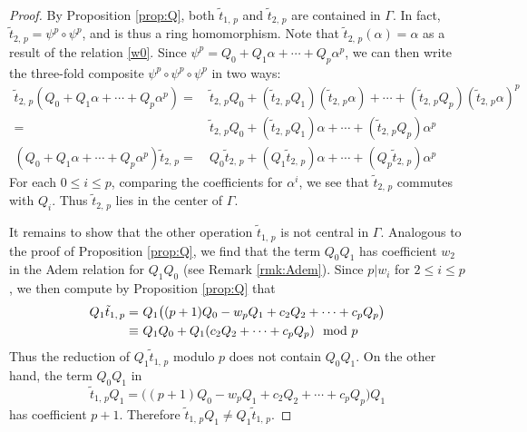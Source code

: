 \documentclass{gtpart}
\theoremstyle{definition}
\theoremstyle{remark}
\newcommand{\md}{~~{\rm mod}~}
\newcommand{\A}{\alpha}
\newcommand{\G}{\Gamma}
\renewcommand{\=}{\approx}
\renewcommand{\-}{\sim}
\numberwithin{equation}{section}
\numberwithin{thm}{section}
\begin{document}
\begin{proof}
 By Proposition \ref{prop:Q}, both $\tilde{t}_{1,\,p}$ and $\tilde{t}_{2,\,p}$ 
 are contained in $\G$.  In fact, $\tilde{t}_{2,\,p} = \psi^p \circ \psi^p$, and 
 is thus a ring homomorphism.  Note that $\tilde{t}_{2,\,p}(\A) = \A$ as a 
 result of the relation \eqref{w0}.  Since 
 $\psi^p = Q_0 + Q_1 \A + \cdots + Q_p \A^p$, we can then write the three-fold 
 composite $\psi^p \circ \psi^p \circ \psi^p$ in two ways: 
 \begin{equation*}
  \begin{split}
   \tilde{t}_{2,\,p} (Q_0 + Q_1 \A + \cdots + Q_p \A^p) = 
    & ~ \tilde{t}_{2,\,p} Q_0 + (\tilde{t}_{2,\,p} Q_1) (\tilde{t}_{2,\,p} \A) 
      + \cdots + (\tilde{t}_{2,\,p} Q_p) (\tilde{t}_{2,\,p} \A)^p \\
                                                        = 
    & ~ \tilde{t}_{2,\,p} Q_0 + (\tilde{t}_{2,\,p} Q_1) \A + \cdots 
      + (\tilde{t}_{2,\,p} Q_p) \A^p \\
   (Q_0 + Q_1 \A + \cdots + Q_p \A^p) \tilde{t}_{2,\,p} = 
    & ~ Q_0 \tilde{t}_{2,\,p} + (Q_1 \tilde{t}_{2,\,p}) \A + \cdots 
      + (Q_p \tilde{t}_{2,\,p}) \A^p 
  \end{split}
 \end{equation*}
 For each $0 \leq i \leq p$, comparing the coefficients for $\A^i$, we see that 
 $\tilde{t}_{2,\,p}$ commutes with $Q_i$.  Thus $\tilde{t}_{2,\,p}$ lies in the 
 center of $\G$.  

 It remains to show that the other operation $\tilde{t}_{1,\,p}$ is not central 
 in $\G$.  Analogous to the proof of Proposition \ref{prop:Q}, we find that the 
 term $Q_0 Q_1$ has coefficient $w_2$ in the Adem relation for $Q_1 Q_0$ (see 
 Remark \ref{rmk:Adem}).  Since $p | w_i$ for $2 \leq i \leq p$, we then compute 
 by Proposition \ref{prop:Q} that 
 \begin{equation*}
  \begin{split}
   Q_1 \tilde{t}_{1,\,p} = & ~ Q_1 \big( (p + 1) Q_0 - w_p Q_1 + c_2 Q_2 
                             + \cdots + c_p Q_p \big) \\
                    \equiv & ~ Q_1 Q_0 + Q_1 (c_2 Q_2 + \cdots + c_p Q_p) \md p 
  \end{split}
 \end{equation*}
 Thus the reduction of $Q_1 \tilde{t}_{1,\,p}$ modulo $p$ does not contain 
 $Q_0 Q_1$.  On the other hand, the term $Q_0 Q_1$ in 
 \[
  \tilde{t}_{1,\,p} Q_1 = \big( (p + 1) Q_0 - w_p Q_1 + c_2 Q_2 + \cdots 
  + c_p Q_p \big) Q_1 
 \]
 has coefficient $p + 1$.  Therefore 
 $\tilde{t}_{1,\,p} Q_1 \neq Q_1 \tilde{t}_{1,\,p}$.  
\end{proof}
\end{document}
